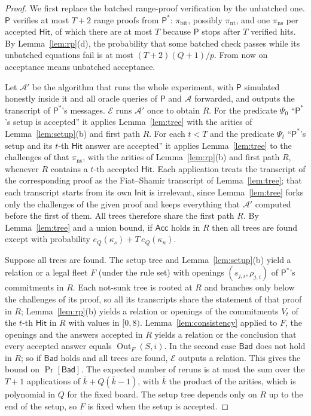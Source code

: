 \documentclass[11pt]{article}
\theoremstyle{definition}
\theoremstyle{remark}
\newcommand{\Out}{\operatorname{Out}}
\begin{document}
\begin{proof}
We first replace the batched range-proof verification by the unbatched one. $\mathsf P$ verifies at most $T+2$ range proofs from $\mathsf P^\ast$: $\pi_{\mathrm{bit}}$, possibly $\pi_{\mathrm{nt}}$, and one $\pi_{\mathrm{ns}}$ per accepted $\mathsf{Hit}$, of which there are at most $T$ because $\mathsf P$ stops after $T$ verified hits. By Lemma~\ref{lem:rp}(d), the probability that some batched check passes while its unbatched equations fail is at most $(T+2)(Q+1)/p$. From now on acceptance means unbatched acceptance.

Let $\mathcal A'$ be the algorithm that runs the whole experiment, with $\mathsf P$ simulated honestly inside it and all oracle queries of $\mathsf P$ and $\mathcal A$ forwarded, and outputs the transcript of $\mathsf P^\ast$'s messages. $\mathcal E$ runs $\mathcal A'$ once to obtain $R$. For the predicate $\Psi_0$ ``$\mathsf P^\ast$'s setup is accepted'' it applies Lemma~\ref{lem:tree} with the arities of Lemma~\ref{lem:setup}(b) and first path $R$. For each $t<T$ and the predicate $\Psi_t$ ``$\mathsf P^\ast$'s setup and its $t$-th $\mathsf{Hit}$ answer are accepted'' it applies Lemma~\ref{lem:tree} to the challenges of that $\pi_{\mathrm{ns}}$, with the arities of Lemma~\ref{lem:rp}(b) and first path $R$, whenever $R$ contains a $t$-th accepted $\mathsf{Hit}$. Each application treats the transcript of the corresponding proof as the Fiat--Shamir transcript of Lemma~\ref{lem:tree}; that each transcript starts from its own $\mathsf{Init}$ is irrelevant, since Lemma~\ref{lem:tree} forks only the challenges of the given proof and keeps everything that $\mathcal A'$ computed before the first of them. All trees therefore share the first path $R$. By Lemma~\ref{lem:tree} and a union bound, if $\mathsf{Acc}$ holds in $R$ then all trees are found except with probability $e_Q(\kappa_s)+T\,e_Q(\kappa_n)$.

Suppose all trees are found. The setup tree and Lemma~\ref{lem:setup}(b) yield a relation or a legal fleet $F$ (under the rule set) with openings $(s_{j,i},\rho_{j,i})$ of $\mathsf P^\ast$'s commitments in $R$. Each not-sunk tree is rooted at $R$ and branches only below the challenges of its proof, so all its transcripts share the statement of that proof in $R$; Lemma~\ref{lem:rp}(b) yields a relation or openings of the commitments $V_t$ of the $t$-th $\mathsf{Hit}$ in $R$ with values in $[0,8)$. Lemma~\ref{lem:consistency} applied to $F$, the openings and the answers accepted in $R$ yields a relation or the conclusion that every accepted answer equals $\Out_F(S,i)$. In the second case $\mathsf{Bad}$ does not hold in $R$; so if $\mathsf{Bad}$ holds and all trees are found, $\mathcal E$ outputs a relation. This gives the bound on $\Pr[\mathsf{Bad}]$. The expected number of reruns is at most the sum over the $T+1$ applications of $\bar k+Q(\bar k-1)$, with $\bar k$ the product of the arities, which is polynomial in $Q$ for the fixed board. The setup tree depends only on $R$ up to the end of the setup, so $F$ is fixed when the setup is accepted.
\end{proof}
\end{document}
